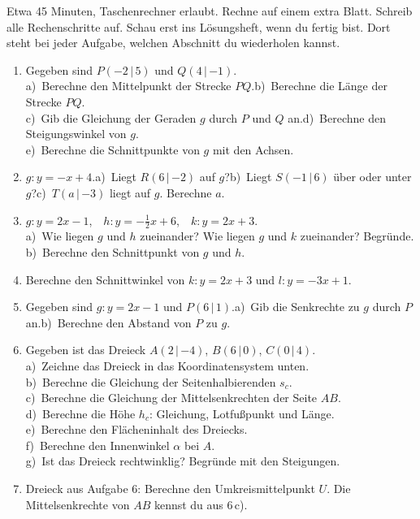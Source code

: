 \documentclass[11pt]{article}
\gdef\aktkenn{}
\newcommand{\Pk}[3]{\ensuremath{#1(#2\,|\,{#3})}}
\newcommand{\abschnitt}[3]{\clearpage\gdef\aktkenn{#1}\label{s:#1}%
  \noindent\colorbox{black!12}{\makebox[10mm]{\Large\bfseries\strut #1}}\hspace{3mm}{\Large\bfseries #2}\par\smallskip
  \noindent #3\par\medskip}
\newlength{\kr}
\newcommand{\zs}{\leavevmode\llap{\scriptsize\color{mbgrau}Zusatz\hspace{9mm}}}
\begin{document}
\abschnitt{T}{Probetest}{Etwa 45 Minuten, Taschenrechner erlaubt. Rechne auf einem extra Blatt. Schreib alle Rechenschritte auf. Schau erst ins Lösungsheft, wenn du fertig bist. Dort steht bei jeder Aufgabe, welchen Abschnitt du wiederholen kannst.}
\begin{enumerate}[label=\textbf{\arabic*.},leftmargin=7mm,itemsep=9pt]
\item Gegeben sind \Pk{P}{-2}{5} und \Pk{Q}{4}{-1}.\\
a)\ Berechne den Mittelpunkt der Strecke $PQ$.\quad b)\ Berechne die Länge der Strecke $PQ$.\\
c)\ Gib die Gleichung der Geraden $g$ durch $P$ und $Q$ an.\quad d)\ Berechne den Steigungswinkel von $g$.\\
e)\ Berechne die Schnittpunkte von $g$ mit den Achsen.
\item $g\colon y = -x + 4$.\quad a)\ Liegt \Pk{R}{6}{-2} auf $g$?\quad b)\ Liegt \Pk{S}{-1}{6} über oder unter $g$?\quad c)\ \Pk{T}{a}{-3} liegt auf $g$. Berechne $a$.
\item $g\colon y = 2x - 1$,\ \ $h\colon y = -\tfrac12x + 6$,\ \ $k\colon y = 2x + 3$.\\
a)\ Wie liegen $g$ und $h$ zueinander? Wie liegen $g$ und $k$ zueinander? Begründe.\\
b)\ Berechne den Schnittpunkt von $g$ und $h$.
\item Berechne den Schnittwinkel von $k\colon y = 2x + 3$ und $l\colon y = -3x + 1$.
\item Gegeben sind $g\colon y = 2x - 1$ und \Pk{P}{6}{1}.\quad a)\ Gib die Senkrechte zu $g$ durch $P$ an.\quad b)\ Berechne den Abstand von $P$ zu $g$.
\item Gegeben ist das Dreieck \Pk{A}{2}{-4}, \Pk{B}{6}{0}, \Pk{C}{0}{4}.\\
a)\ Zeichne das Dreieck in das Koordinatensystem unten.\\
b)\ Berechne die Gleichung der Seitenhalbierenden $s_c$.\\
c)\ Berechne die Gleichung der Mittelsenkrechten der Seite $AB$.\\
d)\ Berechne die Höhe $h_c$: Gleichung, Lotfußpunkt und Länge.\\
e)\ Berechne den Flächeninhalt des Dreiecks.\\
f)\ Berechne den Innenwinkel $\alpha$ bei $A$.\\
g)\ Ist das Dreieck rechtwinklig? Begründe mit den Steigungen.
\item \zs Dreieck aus Aufgabe 6: Berechne den Umkreismittelpunkt $U$. Die Mittelsenkrechte von $AB$ kennst du aus 6\,c).
\end{enumerate}
\medskip
\begin{center}
\begin{ksys}[xmin=-2,xmax=8,ymin=-5,ymax=5,karo=0.55]
\end{ksys}
\end{center}
\end{document}

